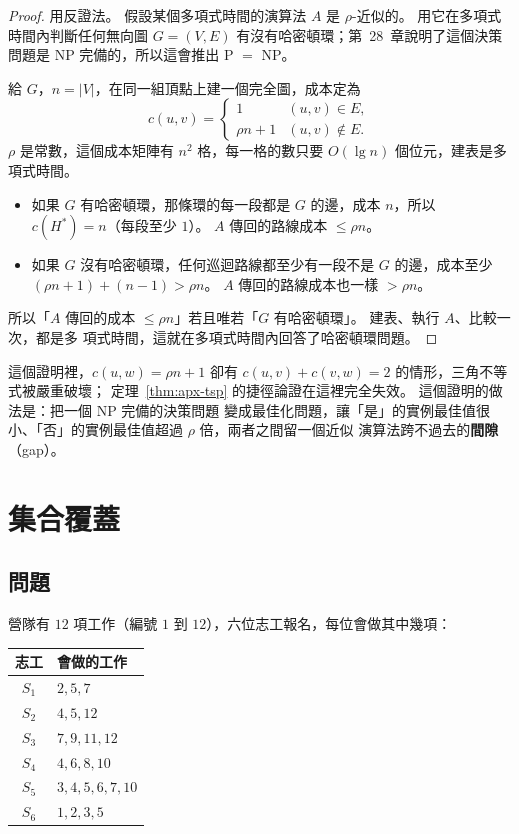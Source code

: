 \begin{proof}
用反證法。 假設某個多項式時間的演算法 $A$ 是 $\rho$-近似的。 用它在多項式時間內判斷任何無向圖
$G = (V, E)$ 有沒有哈密頓環；第~28~章說明了這個決策問題是 NP 完備的，所以這會推出 P $=$ NP。

給 $G$，$n = |V|$，在同一組頂點上建一個完全圖，成本定為
\[
c(u, v) =
\begin{cases}
1 & (u, v) \in E, \\
\rho n + 1 & (u, v) \notin E .
\end{cases}
\]
$\rho$ 是常數，這個成本矩陣有 $n^2$ 格，每一格的數只要 $O(\lg n)$ 個位元，建表是多項式時間。

\begin{itemize}
\item 如果 $G$ 有哈密頓環，那條環的每一段都是 $G$ 的邊，成本 $n$，所以 $c(H^*) = n$（每段至少
$1$）。 $A$ 傳回的路線成本 $\le \rho n$。
\item 如果 $G$ 沒有哈密頓環，任何巡迴路線都至少有一段不是 $G$ 的邊，成本至少
$(\rho n + 1) + (n - 1) > \rho n$。 $A$ 傳回的路線成本也一樣 $> \rho n$。
\end{itemize}

所以「$A$ 傳回的成本 $\le \rho n$」若且唯若「$G$ 有哈密頓環」。 建表、執行 $A$、比較一次，都是多
項式時間，這就在多項式時間內回答了哈密頓環問題。
\end{proof}

這個證明裡，$c(u, w) = \rho n + 1$ 卻有 $c(u, v) + c(v, w) = 2$ 的情形，三角不等式被嚴重破壞；
定理~\ref{thm:apx-tsp} 的捷徑論證在這裡完全失效。 這個證明的做法是：把一個 NP 完備的決策問題
變成最佳化問題，讓「是」的實例最佳值很小、「否」的實例最佳值超過 $\rho$ 倍，兩者之間留一個近似
演算法跨不過去的\textbf{間隙}（gap）。

\section{集合覆蓋}
\label{sec:apx-sc}

\subsection{問題}

營隊有 $12$ 項工作（編號 $1$ 到 $12$），六位志工報名，每位會做其中幾項：

\begin{center}
\begin{tabular}{cl}
\toprule
志工 & 會做的工作 \\
\midrule
$S_1$ & $2, 5, 7$ \\
$S_2$ & $4, 5, 12$ \\
$S_3$ & $7, 9, 11, 12$ \\
$S_4$ & $4, 6, 8, 10$ \\
$S_5$ & $3, 4, 5, 6, 7, 10$ \\
$S_6$ & $1, 2, 3, 5$ \\
\bottomrule
\end{tabular}
\end{center}

